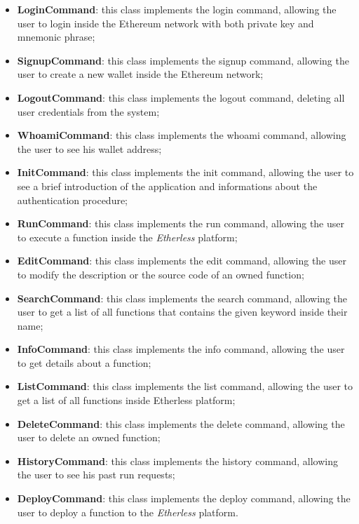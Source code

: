 			\begin{itemize}
				\item \textbf{LoginCommand}: this class implements the login command, allowing the user to login inside the Ethereum network with both private key and mnemonic phrase; 
				\item \textbf{SignupCommand}: this class implements the signup command, allowing the user to create a new wallet inside the Ethereum network; 
				\item \textbf{LogoutCommand}: this class implements the logout command, deleting all user credentials from the system;  
				\item \textbf{WhoamiCommand}: this class implements the whoami command, allowing the user to see his wallet address; 
				\item \textbf{InitCommand}: this class implements the init command, allowing the user to see a brief introduction of the application and informations about the authentication procedure; 
				\item \textbf{RunCommand}: this class implements the run command, allowing the user to execute a function inside the \textit{Etherless} platform; 
				\item \textbf{EditCommand}: this class implements the edit command, allowing the user to modify the description or the source code of an owned function; 
				\item \textbf{SearchCommand}: this class implements the search command, allowing the user to get a list of all functions that contains the given keyword inside their name; 
				\item \textbf{InfoCommand}: this class implements the info command, allowing the user to get details about a function;
				\item \textbf{ListCommand}: this class implements the list command, allowing the user to get a list of all functions inside Etherless platform; 
				\item \textbf{DeleteCommand}: this class implements the delete command, allowing the user to delete an owned function; 
				\item \textbf{HistoryCommand}: this class implements the history command, allowing the user to see his past run requests;
				\item \textbf{DeployCommand}: this class implements the deploy command, allowing the user to deploy a function to the \textit{Etherless} platform.
			\end{itemize}
		
